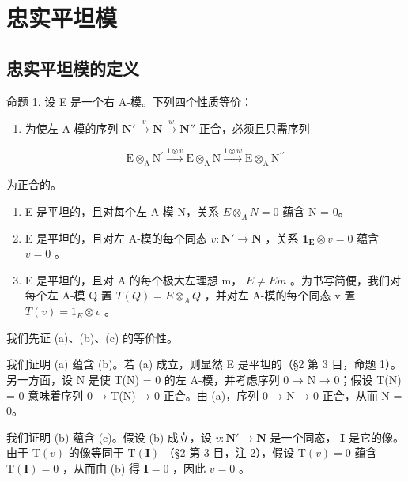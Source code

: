 \section{忠实平坦模}

\subsection{忠实平坦模的定义}

命题 1. 设 E 是一个右 A-模。下列四个性质等价：

\begin{enumerate}
\def\labelenumi{(\alph{enumi})}
\tightlist
\item
  为使左 A-模的序列 \(\mathbf{N}' \xrightarrow{v} \mathbf{N} \xrightarrow{w} \mathbf{N}''\) 正合，必须且只需序列
\end{enumerate}

\[
\mathrm{E} \otimes_ {\mathrm{A}} \mathrm{N} ^ {\prime} \xrightarrow {1 \otimes v} \mathrm{E} \otimes_ {\mathrm{A}} \mathrm{N} \xrightarrow {1 \otimes w} \mathrm{E} \otimes_ {\mathrm{A}} \mathrm{N} ^ {\prime \prime}
\]

为正合的。

\begin{enumerate}
\def\labelenumi{(\alph{enumi})}
\setcounter{enumi}{1}
\item
  E 是平坦的，且对每个左 A-模 N，关系 \(E \otimes_{A} N = 0\) 蕴含 N = 0。
\item
  E 是平坦的，且对左 A-模的每个同态 \(v: \mathbf{N}' \to \mathbf{N}\) ，关系 \(\mathbf{1}_{\mathbf{E}} \otimes v = 0\) 蕴含 \(v = 0\) 。
\item
  E 是平坦的，且对 A 的每个极大左理想 m， \(E \neq Em\) 。为书写简便，我们对每个左 A-模 Q 置 \(T(Q) = E \otimes_{A} Q\) ，并对左 A-模的每个同态 v 置 \(T(v) = 1_{E} \otimes v\) 。
\end{enumerate}

我们先证 (a)、(b)、(c) 的等价性。

我们证明 (a) 蕴含 (b)。若 (a) 成立，则显然 E 是平坦的（§2 第 3 目，命题 1）。另一方面，设 N 是使 T(N) = 0 的左 A-模，并考虑序列 0 → N → 0；假设 T(N) = 0 意味着序列 0 → T(N) → 0 正合。由 (a)，序列 0 → N → 0 正合，从而 N = 0。

我们证明 (b) 蕴含 (c)。假设 (b) 成立，设 \(v: \mathbf{N}' \to \mathbf{N}\) 是一个同态， \(\mathbf{I}\) 是它的像。由于 \(\mathrm{T}(v)\) 的像等同于 \(\mathrm{T}(\mathbf{I})\) （§2 第 3 目，注 2），假设 \(\mathrm{T}(v) = 0\) 蕴含 \(\mathrm{T}(\mathbf{I}) = 0\) ，从而由 (b) 得 \(\mathbf{I} = 0\) ，因此 \(v = 0\) 。

